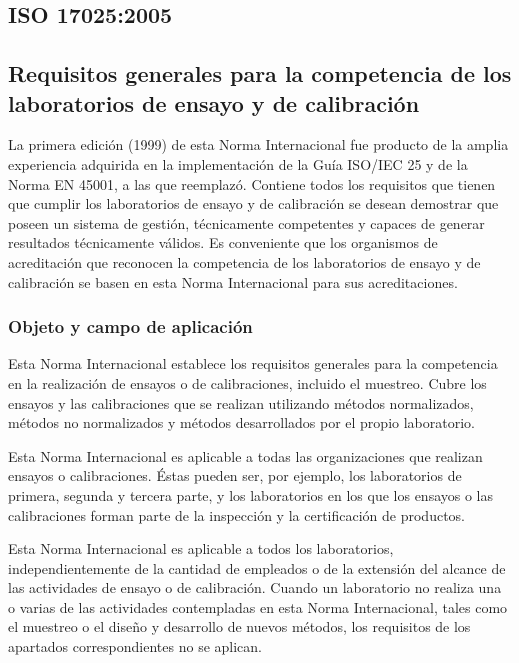 \subsection{ISO 17025:2005 \cite{iso17025}}
\subsection*{Requisitos generales para la competencia de los laboratorios de ensayo y de calibración}

\par 
La primera edición (1999) de esta Norma Internacional fue producto de la amplia experiencia adquirida en la
implementación de la Guía ISO/IEC 25 y de la Norma EN 45001, a las que reemplazó. Contiene todos los
requisitos que tienen que cumplir los laboratorios de ensayo y de calibración se desean demostrar que poseen
un sistema de gestión, técnicamente competentes y capaces de generar resultados técnicamente
válidos. Es conveniente que los organismos de acreditación que reconocen la competencia de los laboratorios de
ensayo y de calibración se basen en esta Norma Internacional para sus acreditaciones.

\subsubsection{Objeto y campo de aplicación}
\par
Esta Norma Internacional establece los requisitos generales para la competencia en la realización de
ensayos o de calibraciones, incluido el muestreo. Cubre los ensayos y las calibraciones que se realizan
utilizando métodos normalizados, métodos no normalizados y métodos desarrollados por el propio laboratorio.

\par \noindent
Esta Norma Internacional es aplicable a todas las organizaciones que realizan ensayos o calibraciones.
Éstas pueden ser, por ejemplo, los laboratorios de primera, segunda y tercera parte, y los laboratorios en los que los ensayos o las calibraciones forman parte de la inspección y la certificación de productos.

\par \noindent
Esta Norma Internacional es aplicable a todos los laboratorios, independientemente de la cantidad de
empleados o de la extensión del alcance de las actividades de ensayo o de calibración. Cuando un laboratorio no realiza una o varias de las actividades contempladas en esta Norma Internacional, tales como el muestreo o el diseño y desarrollo de nuevos métodos, los requisitos de los apartados correspondientes no se aplican.

